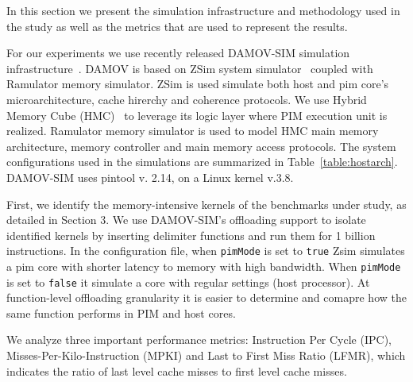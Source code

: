

In this section we present the simulation infrastructure and methodology used in the study as well as the metrics that are used to represent the results.  

For our experiments we use recently released DAMOV-SIM simulation infrastructure~\cite{71}. DAMOV is based on ZSim system simulator~\cite{zsim} coupled with Ramulator memory simulator\cite{ramulator}. ZSim is used simulate both host and pim core's microarchitecture, cache hirerchy and coherence protocols. We use Hybrid Memory Cube (HMC)~\cite{hmc} to leverage its logic layer where PIM execution unit is realized. Ramulator memory simulator is used to model HMC main memory architecture, memory controller and main memory access protocols. The system configurations used in the simulations are summarized in Table~\ref{table:hostarch}. DAMOV-SIM uses pintool v. 2.14, on a Linux kernel v.3.8.  

First, we identify the memory-intensive kernels of the benchmarks under study, as detailed in Section 3. We use DAMOV-SIM's offloading support to isolate identified kernels by inserting delimiter functions and run them for 1 billion instructions. In the configuration file, when \texttt{pimMode} is set to \texttt{true} Zsim simulates a pim core with shorter latency to memory with high bandwidth. When \texttt{pimMode} is set to \texttt{false} it simulate a core with regular settings (host processor). At function-level offloading granularity it is easier to determine and comapre how the same function performs in PIM and host cores. %

We analyze three important performance metrics: Instruction Per Cycle (IPC), Misses-Per-Kilo-Instruction (MPKI) and Last to First Miss Ratio (LFMR), which indicates the ratio of last level cache misses to first level cache misses.    











